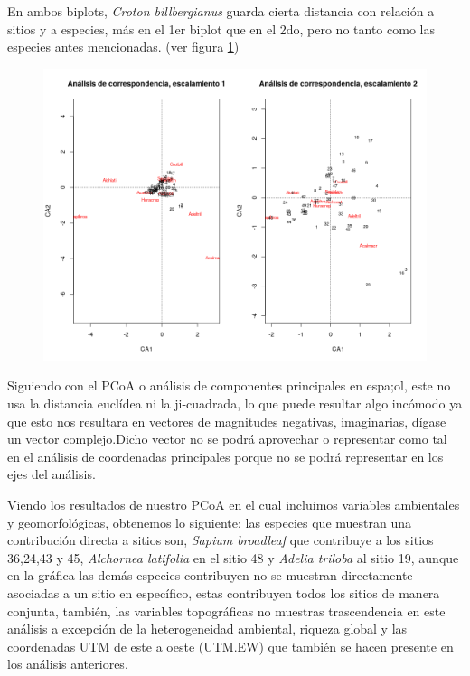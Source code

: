 \documentclass[11pt,]{article}
\begin{document}
En ambos biplots, \emph{Croton billbergianus} guarda cierta distancia
con relación a sitios y a especies, más en el 1er biplot que en el 2do,
pero no tanto como las especies antes mencionadas. (ver figura
\ref{fig:biplot_ca})

\begin{figure}
\centering
\includegraphics{biplot_ca.png}
\caption{\label{fig:biplot_ca}}
\end{figure}

Siguiendo con el PCoA o análisis de componentes principales en espa;ol,
este no usa la distancia euclídea ni la ji-cuadrada, lo que puede
resultar algo incómodo ya que esto nos resultara en vectores de
magnitudes negativas, imaginarias, dígase un vector complejo.Dicho
vector no se podrá aprovechar o representar como tal en el análisis de
coordenadas principales porque no se podrá representar en los ejes del
análisis.

Viendo los resultados de nuestro PCoA en el cual incluimos variables
ambientales y geomorfológicas, obtenemos lo siguiente: las especies que
muestran una contribución directa a sitios son, \emph{Sapium broadleaf}
que contribuye a los sitios 36,24,43 y 45, \emph{Alchornea latifolia} en
el sitio 48 y \emph{Adelia triloba} al sitio 19, aunque en la gráfica
las demás especies contribuyen no se muestran directamente asociadas a
un sitio en específico, estas contribuyen todos los sitios de manera
conjunta, también, las variables topográficas no muestras trascendencia
en este análisis a excepción de la heterogeneidad ambiental, riqueza
global y las coordenadas UTM de este a oeste (UTM.EW) que también se
hacen presente en los análisis anteriores.
\end{document}
